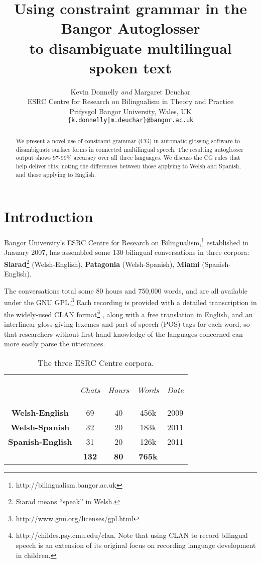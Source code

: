 \documentclass[11pt]{article}
\title{Using constraint grammar in the Bangor Autoglosser\\ to disambiguate multilingual spoken text}
\author{Kevin Donnelly \textit{and} Margaret Deuchar\\
  ESRC Centre for Research on Bilingualism in Theory and Practice\\
  Prifysgol Bangor University, Wales, UK\\
  {\tt \{k.donnelly|m.deuchar\}@bangor.ac.uk}  }
\date{}
\begin{document}
\maketitle
\begin{abstract}
We present a novel use of constraint grammar (CG) in automatic glossing software to disambiguate surface forms in connected multilingual speech.  The resulting autoglosser output shows 97-99\% accuracy over all three languages.  We discuss the CG rules that help deliver this, noting the differences between those applying to Welsh and Spanish, and those applying to English.
\end{abstract}


\smallskip
\section{Introduction}
\label{sec:intro}


Bangor University's ESRC Centre for Research on Bilingualism,\footnote{http://bilingualism.bangor.ac.uk} established in Jnauary 2007, has assembled some 130 bilingual conversations in three corpora: \textbf{Siarad}\footnote{Siarad means ``speak'' in Welsh.} (Welsh-English), \textbf{Patagonia} (Welsh-Spanish), \textbf{Miami} (Spanish-English).

The conversations total some 80 hours and 750,000 words, and are all available under the GNU GPL.\footnote{http://www.gnu.org/licenses/gpl.html}  Each recording is provided with a detailed transcription in the widely-used CLAN format\footnote{http://childes.psy.cmu.edu/clan.  Note that using CLAN to record bilingual speech is an extension of its original focus on recording language development in children.} \cite{macwhinney2000}, along with a free translation in English, and an interlinear gloss giving lexemes and part-of-speech (POS) tags for each word, so that researchers without first-hand knowledge of the languages concerned can more easily parse the utterances.

\begin{table}[!hbtp]
\centering
\begin{tabular}{ccccc}
& \begin{small}\textit{Chats}\end{small} & \begin{small}\textit{Hours}\end{small} & \begin{small}\textit{Words}\end{small} & \begin{small}\textit{Date}\end{small} \\
\cline{1-5}\noalign{\smallskip}
\textbf{Welsh-English} & 69 & 40 & 456k & 2009 \\
\textbf{Welsh-Spanish} & 32 & 20 & 183k & 2011 \\
\textbf{Spanish-English} & 31 & 20 & 126k & 2011 \\
\hline\noalign{\smallskip}
& \textbf{132} & \textbf{80} & \textbf{765k} \\
\end{tabular}
\caption{The three ESRC Centre corpora.}
\label{corpora}
\end{table}
\end{document}
